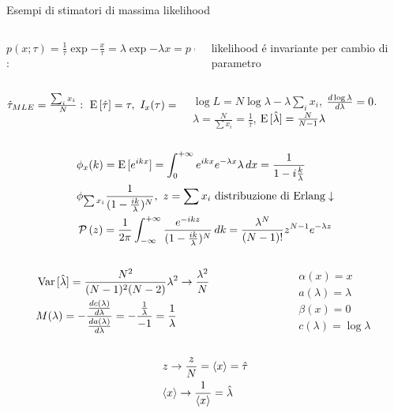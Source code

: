 \documentclass[asd-beamer.tex]{subfiles}
\begin{document}
\begin{wordonframe}{Esempi di stimatori di massima likelihood}
\begin{columns}[T]
\begin{column}{0.6\textwidth}
 $p(x;\tau)=\frac{1}{\tau}\exp{-\frac{x}{\tau}}=\lambda\exp{-\lambda x}=p(x;\lambda)$:
\end{column}
\begin{column}{0.4\textwidth}
likelihood \'e invariante per cambio di parametro
\end{column}
\end{columns}
\begin{columns}[b]
\begin{column}{0.4\textwidth}
$\hat{\tau}_{MLE}=\frac{\sum_ix_i}{N}:\ \E{[\hat{\tau}]}=\tau,\ I_x(\tau)=\frac{1}{\var{\hat{\tau}}},\ \var{\hat{\tau}}=\frac{\tau^2}{N}$
\end{column}
\begin{column}{0.6\textwidth}
$\log{L}=N\log{\lambda}-\lambda\sum_ix_i$, $\frac{d \log{\lambda}}{d \lambda}=0$. $\hat{\lambda}=\frac{N}{\sum x_i}=\frac{1}{\hat{\tau}}$, $\operatorname{E}{[\hat{\lambda}]}=\frac{N}{N-1}\lambda$
\end{column}
\end{columns}
\begin{align*}
&\phi_x(k)=\E{[\exp{ikx}]}=\intzi\exp{ikx}\exp{-\lambda x}\lambda\,dx=\frac{1}{1-i\frac{k}{\lambda}}\\
&\phi_{\sum x_i}\frac{1}{(1-\frac{ik}{\lambda})^N},\ z=\sum x_i\ \text{distribuzione di Erlang}\downarrow\\
&\prob{(z)}=\frac{1}{2\pi}\intsinf{}\frac{\exp{-ikz}}{(1-\frac{ik}{\lambda})^N}\,dk=\frac{\lambda^N}{(N-1)!}z^{N-1}\exp{-\lambda z}
\end{align*}
\begin{columns}[T]
\begin{column}{0.65\textwidth}
\begin{align*}
&\operatorname{Var}{[\hat{\lambda}]}=\frac{N^2}{(N-1)^2(N-2)}\lambda^2\to\frac{\lambda^2}{N}\\
&M(\lambda)=-\frac{\frac{d c(\lambda)}{d \lambda}}{\frac{d a(\lambda)}{d \lambda}}=-\frac{\frac{1}{\lambda}}{-1}=\frac{1}{\lambda}
\end{align*}
\end{column}
\begin{column}{0.35\textwidth}
\begin{align*}
&\alpha(x)=x\\
&a(\lambda)=\lambda\\
&\beta(x)=0\\
&c(\lambda)=\log{\lambda}
\end{align*}
\end{column}
\end{columns}
\begin{align*}
&z\to\frac{z}{N}=\langle x \rangle=\hat{\tau}\\
&\langle x \rangle\to\frac{1}{\langle x \rangle}=\hat{\lambda}
\end{align*}


\end{wordonframe}
\end{document}
